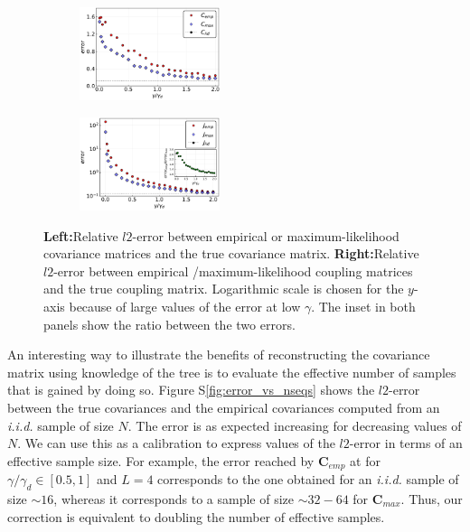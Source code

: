 \documentclass[preprint,amsmath,amssymb,superscriptaddress,showpacs,pre]{revtex4-1}
\newcommand{\sref}[1]{S\ref{#1}}
\begin{document}
\begin{figure}[!htb]
		\begin{subfigure}{}
			\centering\includegraphics[keepaspectratio=true,width=0.45\textwidth]{Figures/epsilon_error_C_L4_balanced_tree_100.pdf}
		\end{subfigure}
		\hspace{1mm}
		\begin{subfigure}{}
			\centering\includegraphics[keepaspectratio=true,width=0.45\textwidth]{Figures/epsilon_error_J_L4_balanced_tree_100.pdf}
		\end{subfigure}
	\caption{\textbf{Left:}Relative $l2$-error between empirical or maximum-likelihood  covariance matrices and the true covariance matrix.  \textbf{Right:}Relative $l2$-error between empirical /maximum-likelihood  coupling matrices and the true coupling matrix. Logarithmic scale is chosen for the $y$-axis because of large values of the error at low $\gamma$. The inset in both panels show the ratio between the two errors.}
	\label{fig:error_1_L4}
\end{figure}

An interesting way to illustrate the benefits of reconstructing the covariance matrix using knowledge of the tree is to evaluate the effective number of samples that is gained by doing so. 
Figure \sref{fig:error_vs_nseqs} shows the $l2$-error between the true covariances and the empirical covariances computed from an \emph{i.i.d.} sample of size $N$. 
The error is as expected increasing for decreasing values of $N$. 
We can use this as a calibration to express values of the $l2$-error in terms of an effective sample size.   
For example, the error reached by $\bm{C}_{emp}$ at for $\gamma/\gamma_d\in[0.5, 1]$ and $L=4$ corresponds to the one obtained for an \emph{i.i.d.} sample of size $\sim 16$, whereas it corresponds to a sample of size $\sim 32-64$ for $\bm{C}_{max}$.
Thus, our correction is equivalent to doubling the number of effective samples.
\end{document}
